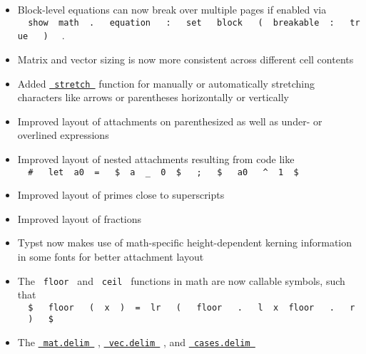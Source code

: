 \begin{itemize}
\tightlist
\item
  Block-level equations can now break over multiple pages if enabled via
  \texttt{\ }{\texttt{\ show\ }}\texttt{\ math\ }{\texttt{\ .\ }}\texttt{\ }{\texttt{\ equation\ }}\texttt{\ }{\texttt{\ :\ }}\texttt{\ }{\texttt{\ set\ }}\texttt{\ }{\texttt{\ block\ }}\texttt{\ }{\texttt{\ (\ }}\texttt{\ breakable\ }{\texttt{\ :\ }}\texttt{\ }{\texttt{\ true\ }}\texttt{\ }{\texttt{\ )\ }}\texttt{\ }
  .
\item
  Matrix and vector sizing is now more consistent across different cell
  contents
\item
  Added \href{/docs/reference/math/stretch/}{\texttt{\ stretch\ }}
  function for manually or automatically stretching characters like
  arrows or parentheses horizontally or vertically
\item
  Improved layout of attachments on parenthesized as well as under- or
  overlined expressions
\item
  Improved layout of nested attachments resulting from code like
  \texttt{\ }{\texttt{\ \#\ }}\texttt{\ }{\texttt{\ let\ }}\texttt{\ a0\ }{\texttt{\ =\ }}\texttt{\ }{\texttt{\ \$\ }}\texttt{\ a\ }{\texttt{\ \_\ }}\texttt{\ 0\ }{\texttt{\ \$\ }}\texttt{\ }{\texttt{\ ;\ }}\texttt{\ }{\texttt{\ \$\ }}\texttt{\ }{\texttt{\ a0\ }}\texttt{\ }{\texttt{\ \^{}\ }}\texttt{\ 1\ }{\texttt{\ \$\ }}\texttt{\ }
\item
  Improved layout of primes close to superscripts
\item
  Improved layout of fractions
\item
  Typst now makes use of math-specific height-dependent kerning
  information in some fonts for better attachment layout
\item
  The \texttt{\ floor\ } and \texttt{\ ceil\ } functions in math are now
  callable symbols, such that
  \texttt{\ }{\texttt{\ \$\ }}\texttt{\ }{\texttt{\ floor\ }}\texttt{\ }{\texttt{\ (\ }}\texttt{\ x\ }{\texttt{\ )\ }}\texttt{\ =\ }{\texttt{\ lr\ }}\texttt{\ }{\texttt{\ (\ }}\texttt{\ }{\texttt{\ floor\ }}\texttt{\ }{\texttt{\ .\ }}\texttt{\ }{\texttt{\ l\ }}\texttt{\ x\ }{\texttt{\ floor\ }}\texttt{\ }{\texttt{\ .\ }}\texttt{\ }{\texttt{\ r\ }}\texttt{\ }{\texttt{\ )\ }}\texttt{\ }{\texttt{\ \$\ }}\texttt{\ }
\item
  The
  \href{/docs/reference/math/mat/\#parameters-delim}{\texttt{\ mat.delim\ }}
  ,
  \href{/docs/reference/math/vec/\#parameters-delim}{\texttt{\ vec.delim\ }}
  , and
  \href{/docs/reference/math/cases/\#parameters-delim}{\texttt{\ cases.delim\ }}

\end{itemize}
